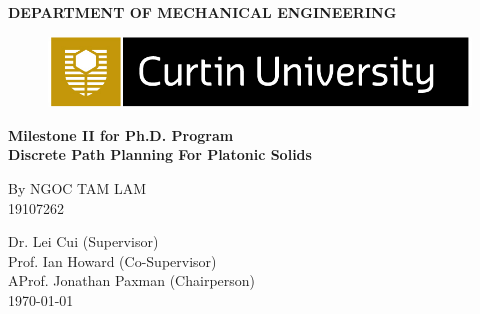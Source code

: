 \begin{titlepage}
\begin{center}
\vspace{1cm}
\large{\textbf{DEPARTMENT OF MECHANICAL ENGINEERING}}\\
\begin{figure}[h]
\includegraphics[width=\textwidth]{Curtinlogo}
\end{figure}

\hfill\break
\hfill\break
\Large{\textbf{Milestone II for Ph.D. Program}}\\[1mm]
\vfill
\huge{\textbf{Discrete Path Planning For Platonic Solids}}\\[1mm]
\vfill

By NGOC TAM LAM\\
19107262\\
\vfill

Dr. Lei Cui (Supervisor)\\
Prof. Ian Howard (Co-Supervisor)\\
AProf. Jonathan Paxman (Chairperson)\\
\vfill
\today\\
\end{center}
\end{titlepage}

